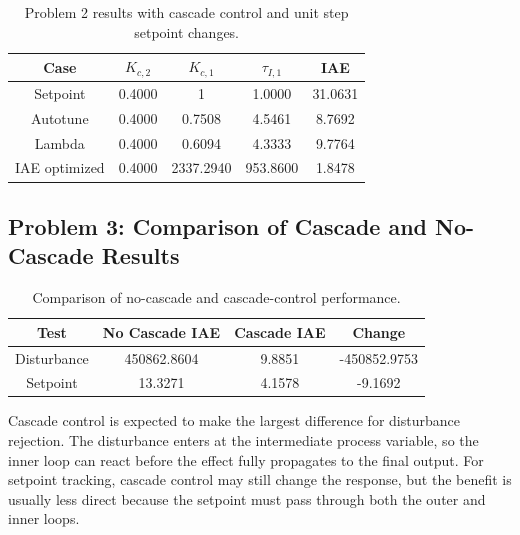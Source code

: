 \documentclass{article}%
\begin{document}
\begin{table}[H]%
\centering%
\begin{tabular}{ccccc}%
\hline%
Case&$K_{c,2}$&$K_{c,1}$&$\tau_{I,1}$&IAE\\%
\hline%
Setpoint&0.4000&1&1.0000&31.0631\\%
\hline%
Autotune&0.4000&0.7508&4.5461&8.7692\\%
\hline%
Lambda&0.4000&0.6094&4.3333&9.7764\\%
\hline%
IAE optimized&0.4000&2337.2940&953.8600&1.8478\\%
\hline%
\end{tabular}%
\caption{Problem 2 results with cascade control and unit step setpoint changes.}%
\label{tab:problem2_cascade_setpoint}%
\end{table}

%
\subsection*{Problem 3: Comparison of Cascade and No{-}Cascade Results}%
\label{subsec:Problem3ComparisonofCascadeandNo{-}CascadeResults}%
\begin{table}[H]%
\centering%
\begin{tabular}{cccc}%
\hline%
Test&No Cascade IAE&Cascade IAE&Change\\%
\hline%
Disturbance&450862.8604&9.8851&{-}450852.9753\\%
\hline%
Setpoint&13.3271&4.1578&{-}9.1692\\%
\hline%
\end{tabular}%
\caption{Comparison of no{-}cascade and cascade{-}control performance.}%
\label{tab:problem3_comparison}%
\end{table}%
Cascade control is expected to make the largest difference for disturbance rejection. The disturbance enters at the intermediate process variable, so the inner loop can react before the effect fully propagates to the final output. For setpoint tracking, cascade control may still change the response, but the benefit is usually less direct because the setpoint must pass through both the outer and inner loops.%
\par

%
\end{document}
